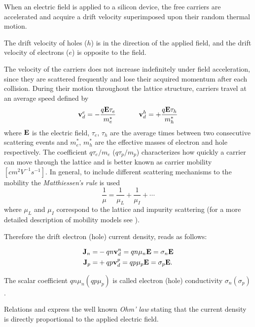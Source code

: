 When an electric field is applied to a silicon device, the free carriers are accelerated and acquire a drift velocity superimposed upon their random thermal motion.

\begin{Osservazione}
The drift velocity of holes ($h$) is in the direction of the applied field, and the drift velocity of electrons ($e$) is opposite to the field.
\end{Osservazione}

The velocity of the carriers does not increase indefinitely under field acceleration, since they are scattered frequently and lose their acquired momentum after each collision.
During their motion throughout the lattice structure, carriers travel at an average speed defined by
\begin{equation}
\label{eq: velocities}
\vect{v}_d^e = - \dfrac{q\vect{E}\tau_e}{m_e^*}  \psp{20} 
\vect{v}_d^h = + \dfrac{q\vect{E}\tau_h}{m_h^*}
\end{equation}
where $\mathbf{E}$ is the electric field, $\tau_e$, $\tau_h$ are the average times between two consecutive scattering events and $m_e^*$, $m_h^*$ are the effective masses of electron and hole respectively.
The coefficient $q\tau_e / m_e$ ($q\tau_p / m_p$) characterizes how quickly a carrier can move through the lattice and is better known as carrier mobility $[cm^2V^{-1}s^{-1}]$.
In general, to include different scattering mechanisms to the mobility the \textit{Matthiessen's rule} is used
\begin{equation}
\dfrac{1}{\mu} = \dfrac{1}{\mu_L} + \dfrac{1}{\mu_I} + \cdots
\end{equation}
where $\mu_L$ and $\mu_I$ correspond to the lattice and impurity scattering (for a more detailed description of mobility models see \cite{ModernVLSIdevices}). 

Therefore the drift electron (hole) current density, reads as follows:

\begin{align}
\mathbf{J}_n =& -qn\mathbf{v}_d^n = qn\mu_n\mathbf{E}   = \sigma_n\mathbf{E} \label{eq: drift electron} \\ 
\mathbf{J}_p =& +qp\mathbf{v}_d^p = qp\mu_p\mathbf{E} = \sigma_p\mathbf{E}. \label{eq: drift hole}
\end{align}

The scalar coefficient $qn\mu_n(qp\mu_p)$ is called electron (hole) conductivity $\sigma_n(\sigma_p)$. 

Relations  and  express the well known \textit{Ohm' law} stating that the current density is directly proportional to the applied electric field.


